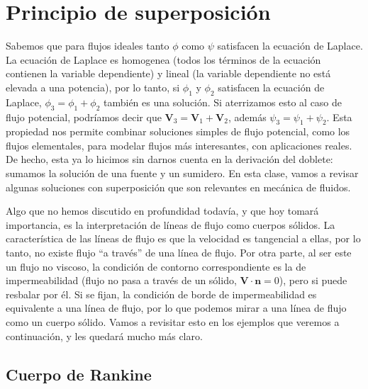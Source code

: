\section*{Principio de superposición}
Sabemos que para flujos ideales tanto $\phi$ como $\psi$ satisfacen la ecuación de Laplace.
La ecuación de Laplace es homogenea (todos los términos de la ecuación contienen la variable dependiente) y lineal (la variable dependiente no está elevada a una potencia), por lo tanto, si $\phi_1$ y $\phi_2$ satisfacen la ecuación de Laplace, $\phi_3=\phi_1+\phi_2$ también es una solución.
Si aterrizamos esto al caso de flujo potencial, podríamos decir que $\mathbf{V}_3=\mathbf{V}_1+\mathbf{V}_2$, además $\psi_3=\psi_1+\psi_2$.
Esta propiedad nos permite combinar soluciones simples de flujo potencial, como los flujos elementales, para modelar flujos más interesantes, con aplicaciones reales.
De hecho, esta ya lo hicimos sin darnos cuenta en la derivación del doblete: sumamos la solución de una fuente y un sumidero.
En esta clase, vamos a revisar algunas soluciones con superposición que son relevantes en mecánica de fluidos.

Algo que no hemos discutido en profundidad todavía, y que hoy tomará importancia, es la interpretación de líneas de flujo como cuerpos sólidos.
La característica de las líneas de flujo es que la velocidad es tangencial a ellas, por lo tanto, no existe flujo ``a través'' de una línea de flujo.
Por otra parte, al ser este un flujo no viscoso, la condición de contorno correspondiente es la de impermeabilidad (flujo no pasa a través de un sólido, $\mathbf{V}\cdot\mathbf{n}=0$), pero si puede resbalar por él.
Si se fijan, la condición de borde de impermeabilidad es equivalente a una línea de flujo, por lo que podemos mirar a una línea de flujo como un cuerpo sólido.
Vamos a revisitar esto en los ejemplos que veremos a continuación, y les quedará mucho más claro.

\subsection*{Cuerpo de Rankine}


